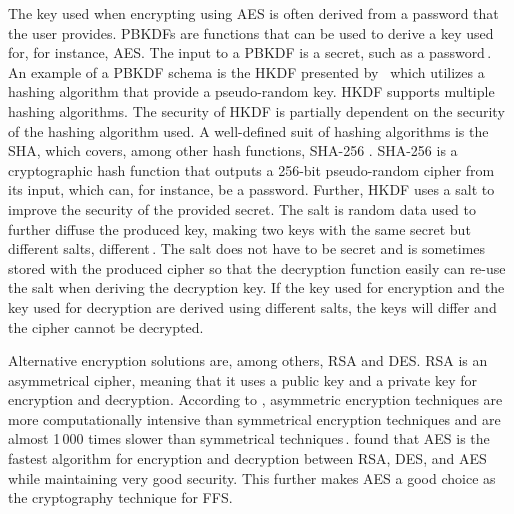 The key used when encrypting using \gls{AES} is often derived from a password that the user provides. \gls{PBKDF}s are functions that can be used to derive a key used for, for instance, \gls{AES}. The input to a \gls{PBKDF} is a secret, such as a password\,\cite{kodwaniSecurityKeyDerivation2021}. An example of a \gls{PBKDF} schema is the \gls{HKDF} presented by \citeauthor{krawczykCryptographicExtractionKey2010}\,\cite{krawczykCryptographicExtractionKey2010}\cite{krawczykHMACbasedExtractandExpandKey2010} which utilizes a hashing algorithm that provide a pseudo-random key. \gls{HKDF} supports multiple hashing algorithms. The security of \gls{HKDF} is partially dependent on the security of the hashing algorithm used. A well-defined suit of hashing algorithms is the \gls{SHA}, which covers, among other hash functions, \gls{SHA}-256 \cite{hansenUSSecureHash2011}. \gls{SHA}-256 is a cryptographic hash function that outputs a 256-bit pseudo-random cipher from its input, which can, for instance, be a password. Further, \gls{HKDF} uses a salt to improve the security of the provided secret. The salt is random data used to further diffuse the produced key, making two keys with the same secret but different salts, different\,\cite{ariasAddingSaltHashing2021}. The salt does not have to be secret and is sometimes stored with the produced cipher so that the decryption function easily can re-use the salt when deriving the decryption key. If the key used for encryption and the key used for decryption are derived using different salts, the keys will differ and the cipher cannot be decrypted.

Alternative encryption solutions are, among others, \gls{RSA} and \gls{DES}. \gls{RSA} is an asymmetrical cipher, meaning that it uses a public key and a private key for encryption and decryption. According to \citeauthor{mahajanStudyEncryptionAlgorithms2013}, asymmetric encryption techniques are more computationally intensive than symmetrical encryption techniques and are almost 1\,000 times slower than symmetrical techniques\,\cite{mahajanStudyEncryptionAlgorithms2013}. \citeauthor{mahajanStudyEncryptionAlgorithms2013} found that \gls{AES} is the fastest algorithm for encryption and decryption between \gls{RSA}, \gls{DES}, and \gls{AES} while maintaining very good security. This further makes \gls{AES} a good choice as the cryptography technique for \gls{FFS}.